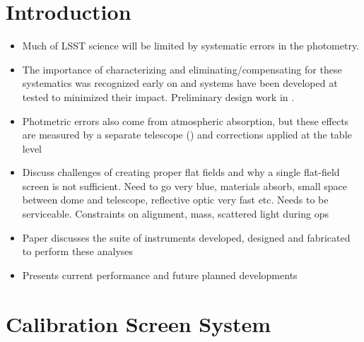 \section{Introduction}

\begin{itemize} 

\item 
Much of LSST science will be limited by systematic errors in the photometry. 
\item 
The importance of characterizing and eliminating/compensating for these systematics was recognized early on and systems have been developed at tested to minimized their impact. Preliminary design work in \cite{Ingraham2016}.
\item Photmetric errors also come from atmospheric absorption, but these effects are measured by a separate telescope (\cite{PSTN-028}) and corrections applied at the table level 
\item 
Discuss challenges of creating proper flat fields and why a single flat-field screen is not sufficient. Need to go very blue, materials absorb, small space between dome and telescope, reflective optic very fast etc. Needs to be serviceable. Constraints on alignment, mass, scattered light during ops 
\item
Paper discusses the suite of instruments developed, designed and fabricated to perform these analyses
\item
Presents current performance and future planned developments
\end{itemize}

 
\section{Calibration Screen System} 

